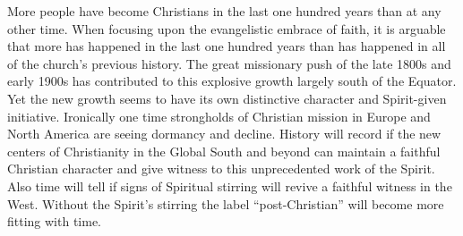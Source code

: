 
\begin{partsummary}
More people have become Christians in the last one hundred years than at any other time. When
focusing upon the evangelistic embrace of faith, it is arguable that more has happened in the last
one hundred years than has happened in all of the church’s previous history. The great missionary
push of the late 1800s and early 1900s has contributed to this explosive growth largely south of the
Equator. Yet the new growth seems to have its own distinctive character and Spirit-given initiative.
Ironically one time strongholds of Christian mission in Europe and North America are seeing dormancy
and decline. History will record if the new centers of Christianity in the Global South and beyond
can maintain a faithful Christian character and give witness to this unprecedented work of the
Spirit. Also time will tell if signs of Spiritual stirring will revive a faithful witness in the
West. Without the Spirit’s stirring the label “post-Christian” will become more fitting with time.
\end{partsummary}

